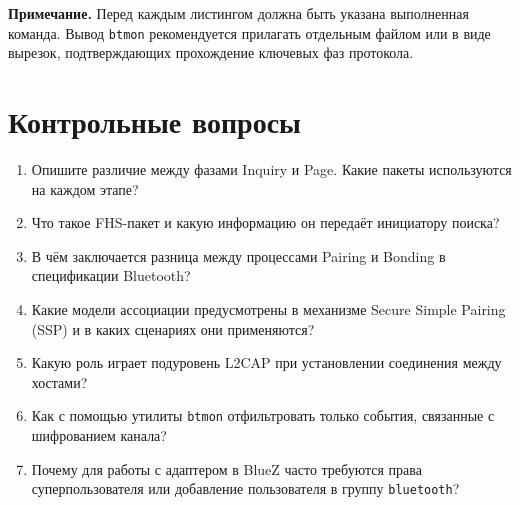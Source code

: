 \textbf{Примечание.} Перед каждым листингом должна быть указана выполненная команда. Вывод \texttt{btmon} рекомендуется прилагать отдельным файлом или в виде вырезок, подтверждающих прохождение ключевых фаз протокола.

\section*{Контрольные вопросы}
\begin{enumerate}[nosep, leftmargin=*]
    \item Опишите различие между фазами Inquiry и Page. Какие пакеты используются на каждом этапе?
    \item Что такое FHS-пакет и какую информацию он передаёт инициатору поиска?
    \item В чём заключается разница между процессами Pairing и Bonding в спецификации Bluetooth?
    \item Какие модели ассоциации предусмотрены в механизме Secure Simple Pairing (SSP) и в каких сценариях они применяются?
    \item Какую роль играет подуровень L2CAP при установлении соединения между хостами?
    \item Как с помощью утилиты \texttt{btmon} отфильтровать только события, связанные с шифрованием канала?
    \item Почему для работы с адаптером в BlueZ часто требуются права суперпользователя или добавление пользователя в группу \texttt{bluetooth}?
\end{enumerate}
